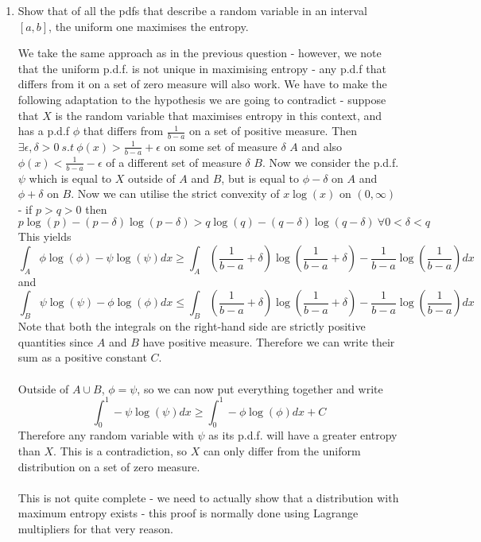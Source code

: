 \documentclass{article}
\newcommand{\chapternumber}{2}
\newenvironment{QandA}{\begin{enumerate}[label=\chapternumber.\arabic*]\bfseries\boldmath}
	{\end{enumerate}}
\newenvironment{answered}{\par\bigskip\normalfont\unboldmath}{}
\begin{document}
\begin{QandA}
\begin{answered}
	\end{answered}

	\item Show that of all the pdfs that describe a random variable in an interval $[a,b]$, the uniform one maximises the entropy.
	\begin{answered}
		We take the same approach as in the previous question - however, we note that the uniform p.d.f. is not unique in maximising entropy - any p.d.f that differs from it on a set of zero measure will also work. We have to make the following adaptation to the hypothesis we are going to contradict - suppose that $X$ is the random variable that maximises entropy in this context, and has a p.d.f $\phi$ that differs from $\frac{1}{b-a}$ on a set of positive measure. Then $\exists\epsilon,\delta>0\ s.t\ \phi(x)>\frac{1}{b-a}+\epsilon$ on some set of measure $\delta$ $A$ and also $\phi(x)<\frac{1}{b-a}-\epsilon$ of a different set of measure $\delta$ $B$. Now we consider the p.d.f. $\psi$ which is equal to $X$ outside of $A$ and $B$, but is equal to $\phi-\delta$ on $A$ and $\phi+\delta$ on $B$. Now we can utilise the strict convexity of $x\log(x)$ on $(0,\infty)$ - if $p>q>0$ then
		\[p\log(p)-(p-\delta)\log(p-\delta) > q\log(q)-(q-\delta)\log(q-\delta)\ \forall0<\delta<q\]
		This yields
		\[\int_A \phi\log(\phi)-\psi\log(\psi)dx\geq\int_A \left(\frac{1}{b-a}+\delta\right)\log\left(\frac{1}{b-a}+\delta\right)-\frac{1}{b-a}\log\left(\frac{1}{b-a}\right)dx\]
		and
		\[\int_B\psi\log(\psi)-\phi\log(\phi)dx\leq\int_B \left(\frac{1}{b-a}+\delta\right)\log\left(\frac{1}{b-a}+\delta\right)-\frac{1}{b-a}\log\left(\frac{1}{b-a}\right)dx\]
		Note that both the integrals on the right-hand side are strictly positive quantities since $A$ and $B$ have positive measure. Therefore we can write their sum as a positive constant $C$.\\
		\\
		Outside of $A\cup B$, $\phi=\psi$, so we can now put everything together and write
		\[\int_0^1-\psi\log(\psi)dx\geq\int_0^1-\phi\log(\phi)dx+C\]
		Therefore any random variable with $\psi$ as its p.d.f. will have a greater entropy than $X$. This is a contradiction, so $X$ can only differ from the uniform distribution on a set of zero measure.\\
		\\
		This is not quite complete - we need to actually show that a distribution with maximum entropy exists - this proof is normally done using Lagrange multipliers for that very reason.
	\end{answered}
	
	\end{QandA}
\end{document}
